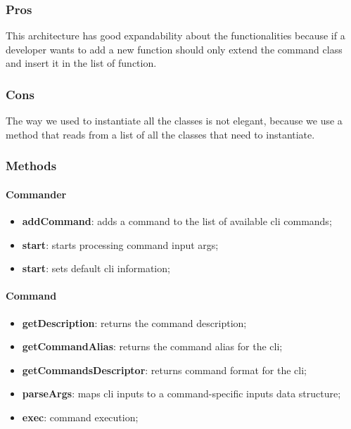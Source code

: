 \subsubsection{Pros}
This architecture has good expandability about the functionalities because if a developer wants to add a new function should only extend the command class and insert it in the list of function.
\subsubsection{Cons}
The way we used to instantiate all the classes is not elegant, because we use a method that reads from a list of all the classes that need to instantiate.

\subsubsection{Methods}
\paragraph{Commander}
\begin{itemize}
    \item \textbf{addCommand}: adds a command to the list of available cli commands;
    \item \textbf{start}: starts processing command input args;
    \item \textbf{start}: sets default cli information;
\end{itemize}
\paragraph{Command}
\begin{itemize}
    \item \textbf{getDescription}: returns the command description;
    \item \textbf{getCommandAlias}: returns the command alias for the cli;
    \item \textbf{getCommandsDescriptor}: returns command format for the cli;
    \item \textbf{parseArgs}: maps cli inputs to a command-specific inputs data structure;
    \item \textbf{exec}: command execution;
\end{itemize}
